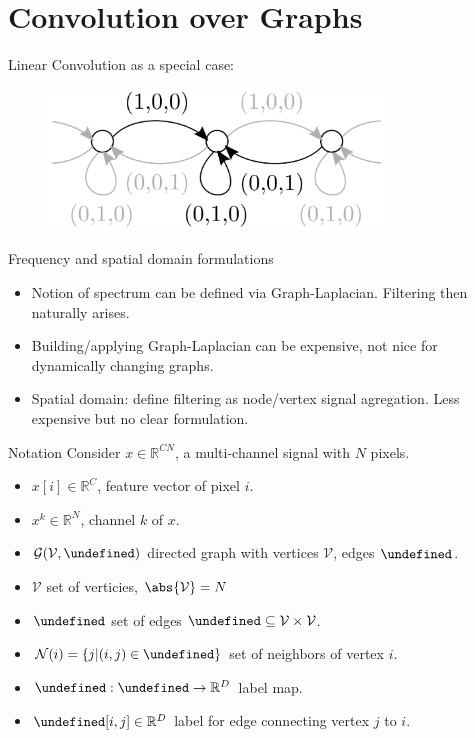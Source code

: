 \documentclass{beamer}
\newcommand{\R}{\mathbb R}
\newcommand{\N}{\mathcal N} %
\newcommand{\E}{\mathbb E}
\newcommand{\G}{\mathcal G} %
\newcommand{\V}{\mathcal V} %
\let\E\undefined
\newcommand{\E}{\mathcal E} %
\let\L\undefined
\newcommand{\L}{\mathcal L} %
\begin{document}
\section{Convolution over Graphs}
\begin{frame}{Linear Convolution as a special case:}
\begin{figure}[H]
\includegraphics[width=0.8\textwidth]{../imgs/1DConv.png}
\caption{\cite{Simonovsky2017ecc}}
\end{figure}
\end{frame}

\begin{frame}{Frequency and spatial domain formulations}
\begin{itemize}
\item Notion of spectrum can be defined via Graph-Laplacian. Filtering then naturally arises.
\item Building/applying Graph-Laplacian can be expensive, not nice for dynamically changing graphs.
\item Spatial domain: define filtering as node/vertex signal agregation. Less expensive but no 
clear formulation.
\end{itemize}
\end{frame}

\begin{frame}{Notation}
Consider $x \in \R^{CN}$, a multi-channel signal with $N$ pixels.
\begin{itemize}
\item $x[i] \in \R^C$, feature vector of pixel $i$.
\item $x^k \in \R^N$, channel $k$ of $x$.
\item $\G(\V,\E)$ directed graph with vertices $\V$, edges $\E$.
\item $\V$ set of verticies, $\abs{\V}=N$
\item $\E$ set of edges $\E \subseteq \V \times \V$.
\item $\N(i) = \{j | (i,j) \in \E \}$ set of neighbors of vertex $i$. 
\item $\L: \E \rightarrow \R^{D}$ label map.
\item $\L[i,j] \in \R^D$ label for edge connecting vertex $j$ to $i$.
\end{itemize}
\end{frame}
\end{document}
